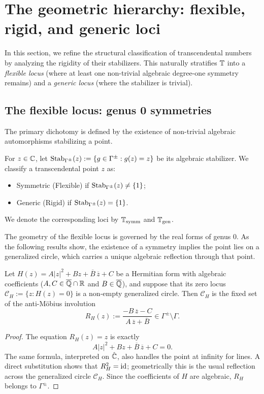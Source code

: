 \section{The geometric hierarchy: flexible, rigid, and generic loci}\label{grct:sec:symmetric-generic}

In this section, we refine the structural classification of transcendental numbers by analyzing the rigidity of their stabilizers. This naturally stratifies $\mathbb{T}$ into a \textit{flexible locus} (where at least one non-trivial algebraic degree-one symmetry remains) and a \textit{generic locus} (where the stabilizer is trivial).

\subsection{The flexible locus: genus 0 symmetries}

The primary dichotomy is defined by the existence of non-trivial algebraic automorphisms stabilizing a point.

\begin{definition}\label{grct:def:stabilizer}
	For $z\in\mathbb{C}$, let $\operatorname{Stab}_{\Gamma^{\pm}}(z):=\{g\in\Gamma^{\pm}:g(z)=z\}$ be its algebraic stabilizer. We classify a transcendental point $z$ as:
	\begin{itemize}[leftmargin=2em]
		\item Symmetric (Flexible) if $\operatorname{Stab}_{\Gamma^{\pm}}(z)\neq\{1\}$;
		\item Generic (Rigid) if $\operatorname{Stab}_{\Gamma^{\pm}}(z)=\{1\}$.
	\end{itemize}
	We denote the corresponding loci by $\mathbb{T}_{\mathrm{symm}}$ and $\mathbb{T}_{\mathrm{gen}}$.
\end{definition}

The geometry of the flexible locus is governed by the real forms of genus $0$. As the following results show, the existence of a symmetry implies the point lies on a generalized circle, which carries a unique algebraic reflection through that point.

\begin{lemma}\label{grct:lem:R_H}
	Let $H(z)=A|z|^2+Bz+\overline{B}\,\overline{z}+C$ be a Hermitian form with algebraic coefficients ($A,C\in\overline{\mathbb{Q}}\cap\mathbb{R}$ and $B\in\overline{\mathbb{Q}}$), and suppose that its zero locus $\mathcal{C}_H:=\{z: H(z)=0\}$ is a non-empty generalized circle. Then $\mathcal{C}_H$ is the fixed set of the anti-Möbius involution
	\[
		R_H(z):=\frac{-B\,\overline{z}-C}{A\,\overline{z}+\overline{B}}\in\Gamma^{\pm}\setminus\Gamma.
	\]
\end{lemma}
\begin{proof}
	The equation $R_H(z)=z$ is exactly
	\[
		A|z|^2+Bz+\overline B\,\overline z+C=0.
	\]
	The same formula, interpreted on $\hat{\mathbb{C}}$, also handles the point at infinity for lines. A direct substitution shows that $R_H^2=\mathrm{id}$; geometrically this is the usual reflection across the generalized circle $\mathcal C_H$. Since the coefficients of $H$ are algebraic, $R_H$ belongs to $\Gamma^{\pm}$.
\end{proof}

